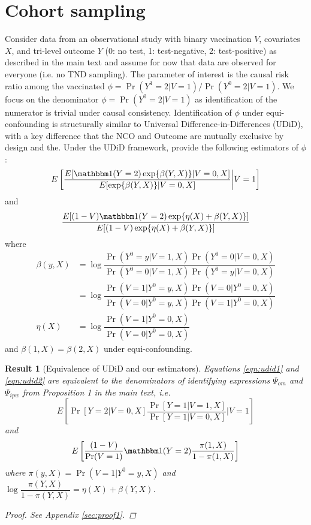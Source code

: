 \documentclass[12pt]{article}
\newtheorem{result}{Result}
\begin{document}
\onehalfspacing
\section{Cohort sampling}
Consider data from an observational study with binary vaccination $V$, covariates $X$, and tri-level outcome $Y$ (0: no test, 1: test-negative, 2: test-positive) as described in the main text and assume for now that data are observed for everyone (i.e. no TND sampling). The parameter of interest is the causal risk ratio among the vaccinated $\phi = \Pr(Y^1=2|V=1)/\Pr(Y^0 = 2 | V = 1)$. We focus on the denominator $\phi = \Pr(Y^0 = 2 | V = 1)$ as identification of the numerator is trivial under causal consistency. Identification of $\phi$ under equi-confounding is structurally similar to Universal Difference-in-Differences (UDiD), with a key difference that the NCO and Outcome are mutually exclusive by design and the. Under the UDiD framework, \textcite{tchetgen_universal_2023} provide the following estimators of $\phi$:
\begin{equation} \label{eqn:udid1}
    E\left[\dfrac{E[\mathbbm 1(Y=2)\exp\{\beta(Y,X)\} | V = 0, X]}{E[\exp\{\beta(Y,X)\} | V = 0, X]}\bigg|V = 1\right]
\end{equation}
and 
\begin{equation}\label{eqn:udid2}
    \dfrac{E[(1-V)\mathbbm 1(Y=2)\exp\{\eta(X) + \beta(Y,X)\}]}{E[(1-V)\exp\{\eta(X) +\beta(Y,X)\}]}
\end{equation}
where
\begin{align*}
    \beta(y,X) &= \log\dfrac{\Pr(Y^0=y|V=1,X)\Pr(Y^0=0|V=0,X)}{\Pr(Y^0=0|V=1,X)\Pr(Y^0=y|V=0, X)} \\
    &= \log\dfrac{\Pr(V=1 | Y^0=y,X)\Pr(V=0|Y^0=0,X)}{\Pr(V=0|Y^0=y, X)\Pr(V=1|Y^0=0,X)} \\
    \eta(X) &= \log \dfrac{\Pr(V = 1 | Y^0 = 0, X)}{\Pr(V = 0 | Y^0 = 0, X)}
\end{align*}
and $\beta(1,X) = \beta(2,X)$ under equi-confounding.
\begin{result}[Equivalence of UDiD and our estimators]\label{res1}
Equations \ref{eqn:udid1} and \ref{eqn:udid2} are equivalent to the denominators of identifying expressions $\Psi_{om}$ and $\Psi_{ipw}$ from Proposition 1 in the main text, i.e.
 \begin{equation}\label{eqn:om_estimand}
        E\left[\Pr[Y = 2 | V = 0, X] \dfrac{\Pr[Y = 1 | V = 1, X]}{\Pr[Y = 1 | V = 0, X]} \Big| V = 1 \right]
    \end{equation}
    and 
    \begin{equation}\label{eqn:ipw_estimand}
        E\left[ \dfrac{(1 - V)}{\Pr(V=1)} \mathbbm 1(Y = 2) \dfrac{\pi(1,X)}{1 - \pi(1,X)}\right]
    \end{equation}
where $\pi(y, X) = \Pr(V = 1 | Y^0 = y, X)$ and $\log \dfrac{\pi(Y, X)}{1 - \pi(Y, X)} = \eta(X) + \beta(Y, X)$.
\begin{proof}
 See Appendix \ref{sec:proof1}.
\end{proof}
\end{result}
\end{document}
